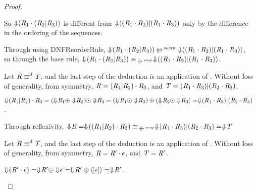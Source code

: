 \documentclass[numbers,10pt,preprint\ifanon ,nocopyrightspace\fi]{sigplanconf}
\begin{document}
\begin{proof}
\begin{case}[\DistributivityLeftRule{}]
    So $\Downarrow\mkern-4mu (\mathit{R}_1 \cdot (\mathit{R}_2 | \mathit{R}_3))$
    is different from $\Downarrow\mkern-4mu ((\mathit{R}_1 \cdot \mathit{R}_2) | (\mathit{R}_1
      \cdot \mathit{R}_3))$ only by the difference in the ordering of the
    sequences.

    Through using DNFReorderRule{},
    $\ToDNFRegexOf{(\Regex_1 \Concat (\Regex_2 \Or
      \Regex_3))} \ParallelRewriteSwap
    \ToDNFRegexOf{((\Regex_1 \Concat \Regex_2) \Or (\Regex_1
      \Concat \Regex_3))}$, so through the base rule,
    $\ToDNFRegexOf{(\Regex_1 \Concat (\Regex_2 \Or
      \Regex_3))} \EquivalenceOf{\ParallelRewriteSwap}
    \ToDNFRegexOf{((\Regex_1 \Concat \Regex_2) \Or (\Regex_1
      \Concat \Regex_3))}$.
  \end{case}

  \begin{case}[\DistributivityRightRule{}]
    Let $\mathit{R} \equiv^d \mathit{T}$, and the last step of the
    deduction is an application of \DistributivityRightRule{}.  Without loss of
    generality, from symmetry,
    $\mathit{R} = (\mathit{R}_1 | \mathit{R}_2) \cdot \mathit{R}_3$, and
    $\mathit{T} = (\mathit{R}_1 \cdot \mathit{R}_3) | (\mathit{R}_2 \cdot \mathit{R}_3)$.

    $\ToDNFRegexOf{(\Regex_1 \Or \Regex_2) \Concat \Regex_3} =
    (\ToDNFRegexOf{\Regex_1} \OrDNF \ToDNFRegexOf{\Regex_2}) \ConcatDNF
    \ToDNFRegexOf{\Regex_3} =
    (\ToDNFRegexOf{\Regex_1} \ConcatDNF \ToDNFRegexOf{\Regex_3}) \OrDNF
    (\ToDNFRegexOf{\Regex_2} \ConcatDNF \ToDNFRegexOf{\Regex_3}) =
    \ToDNFRegexOf{(\Regex_1 \Concat \Regex_3) \Or (\Regex_2 \Concat \Regex_3)}$.
    
    Through reflexivity, $\ToDNFRegexOf{\Regex} = \ToDNFRegexOf{((\Regex_1 \Or
      \Regex_2) \Concat \Regex_3)} \EquivalenceOf{\ParallelRewriteSwap}
    \ToDNFRegexOf{(\Regex_1 \Concat \Regex_3) \Or (\Regex_2 \Concat \Regex_3)}
    = \ToDNFRegexOf{\RegexAlt}$
  \end{case}

  \begin{case}[\ConcatIdentityLeftRule{}]
    Let $\mathit{R} \equiv^d \mathit{T}$, and the last step of the
    deduction is an application of \DistributivityRightRule{}.  Without loss of
    generality, from symmetry,
    $\mathit{R} = \mathit{R}' \cdot \epsilon$, and
    $\mathit{T} = \mathit{R}'$.

    $\Downarrow\mkern-4mu (\mathit{R}' \cdot \epsilon) =
    \Downarrow\mkern-4mu \mathit{R}' \odot \Downarrow\mkern-4mu \epsilon =
    \Downarrow\mkern-4mu \mathit{R}' \odot \langle[\epsilon]\rangle =
    \Downarrow\mkern-4mu \mathit{R}'$.
    

\end{case}
\end{proof}
\end{document}
